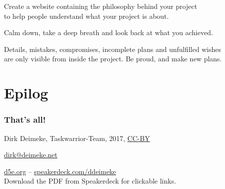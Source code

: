 \documentclass[t,aspectratio=169]{beamer}
\begin{document}
\begin{frame}[fragile]%
    \vfill
    Create a website containing the philosophy behind your project \\
    to help people understand what your project is about.
\end{frame}

\begin{frame}[fragile]%
    \vfill
    Calm down, take a deep breath and look back at what you achieved. \pause

    Details, mistakes, compromises, incomplete plans and unfulfilled wishes \\
    are only visible from inside the project. Be proud, and make new plans.
\end{frame}

\section{Epilog}

\begin{frame}[fragile]\frametitle{That's all!}
    \vfill
    \begin{center}
        Dirk Deimeke, Taskwarrior-Team, 2017, \href{https://creativecommons.org/licenses/by/4.0/}{CC-BY}

        \href{mailto:dirk@deimeke.net}{dirk@deimeke.net}

        \href{https://d5e.org/}{d5e.org} -- \href{https://speakerdeck.com/ddeimeke}{speakerdeck.com/ddeimeke} \\
        {\tiny Download the PDF from Speakerdeck for clickable links.}
    \end{center}
\end{frame}
\end{document}
